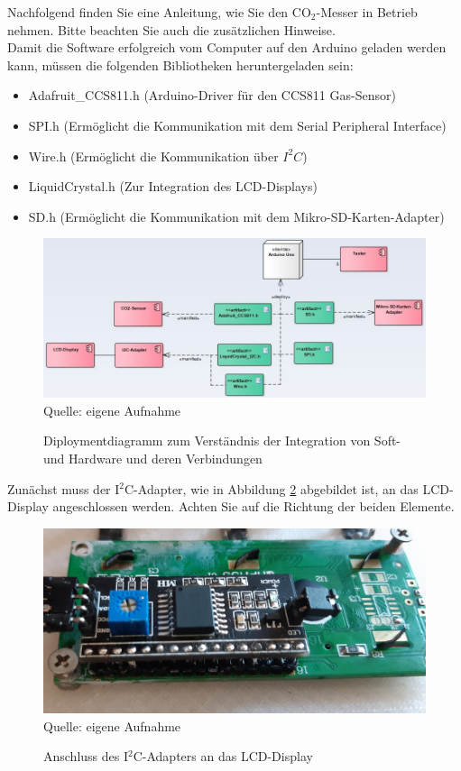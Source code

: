 \label{Installationsanleitung}

Nachfolgend finden Sie eine Anleitung, wie Sie den CO$_2$-Messer in Betrieb nehmen. Bitte beachten Sie auch die zusätzlichen Hinweise. \\
Damit die Software erfolgreich vom Computer auf den Arduino geladen werden kann, müssen die folgenden Bibliotheken heruntergeladen sein:

\begin{itemize}
	\item Adafruit\_CCS811.h (Arduino-Driver für den CCS811 Gas-Sensor)
	\item SPI.h (Ermöglicht die Kommunikation mit dem Serial Peripheral Interface)
	\item Wire.h (Ermöglicht die Kommunikation über $I^2C$)
	\item LiquidCrystal.h (Zur Integration des \ac{LCD}-Displays)
	\item SD.h (Ermöglicht die Kommunikation mit dem Mikro-SD-Karten-Adapter)
\end{itemize}

\begin{figure}[!hbt]
	\centering
	\includegraphics[width=0.9\linewidth]{Images/Diploymentdiagramm}
	\footnotesize \\Quelle: eigene Aufnahme
	\caption{Diploymentdiagramm zum Verständnis der Integration von Soft- und Hardware und deren Verbindungen}
	\label{fig:Diployment}
\end{figure}

Zunächst muss der I$^2$C-Adapter, wie in Abbildung \ref{fig:I2C} abgebildet ist, an das \ac{LCD}-Display angeschlossen werden. Achten Sie auf die Richtung der beiden Elemente. \\

\begin{figure}[!hbt]
	\centering
	\includegraphics[width=0.6\linewidth]{Images/I2C}
	\footnotesize \\Quelle: eigene Aufnahme
	\caption{Anschluss des I$^2$C-Adapters an das \ac{LCD}-Display}
	\label{fig:I2C}
\end{figure}

